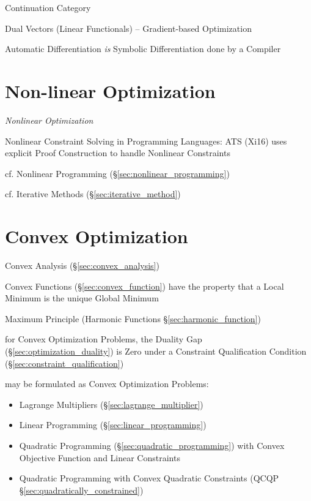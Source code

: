 Continuation Category

Dual Vectors (Linear Functionals) -- Gradient-based Optimization

Automatic Differentiation \emph{is} Symbolic Differentiation done by a Compiler



\section{Non-linear Optimization}\label{sec:nonlinear_optimization}


\emph{Nonlinear Optimization}

Nonlinear Constraint Solving in Programming Languages: ATS (Xi16) uses
explicit Proof Construction to handle Nonlinear Constraints

\fist cf. Nonlinear Programming (\S\ref{sec:nonlinear_programming})

\fist cf. Iterative Methods (\S\ref{sec:iterative_method})



\section{Convex Optimization}\label{sec:convex_optimization}

Convex Analysis (\S\ref{sec:convex_analysis})

Convex Functions (\S\ref{sec:convex_function}) have the property that a Local
Minimum is the unique Global Minimum

Maximum Principle (Harmonic Functions \S\ref{sec:harmonic_function})

for Convex Optimization Problems, the Duality Gap
(\S\ref{sec:optimization_duality}) is Zero under a Constraint Qualification
Condition (\S\ref{sec:constraint_qualification})

may be formulated as Convex Optimization Problems:
\begin{itemize}
  \item Lagrange Multipliers (\S\ref{sec:lagrange_multiplier})
  \item Linear Programming (\S\ref{sec:linear_programming})
  \item Quadratic Programming (\S\ref{sec:quadratic_programming}) with Convex
    Objective Function and Linear Constraints
  \item Quadratic Programming with Convex Quadratic Constraints
    (QCQP \S\ref{sec:quadratically_constrained})
\end{itemize}

